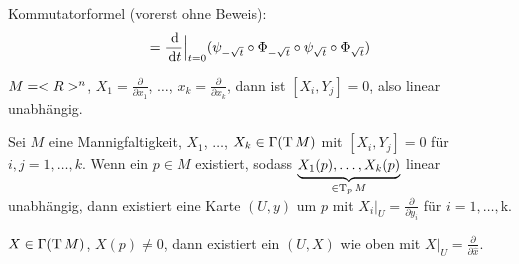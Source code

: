 Kommutatorformel (vorerst ohne Beweis):\begin{align*}
	[X,Y] = \frac{\d}{\d t}\Big|_{t=0} (\psi_{-\sqrt t}\circ \Phi_{-\sqrt t}\circ \psi_{\sqrt t}\circ \Phi_{\sqrt t})
\end{align*}

\begin{example}
	$M=<R>^n$, $X_1 = \frac\partial{\partial x_1}$, $\dots$, $x_k = \frac{\partial}{\partial x_k}$, dann ist $[X_i,Y_j] = 0$, also linear unabhängig.
\end{example}

\begin{proposition}
	Sei $M$ eine Mannigfaltigkeit, $X_1$, $\dots$, $X_k\in\Gamma(\operatorname{T} M)$ mit $[X_i, Y_j] = 0$ für $i,j=1,\dots,k$. Wenn ein $p\in M$ existiert, sodass $\underbrace{X_1(p),\dots, X_k(p)}_{\in\operatorname{T}_p M}$ linear unabhängig, dann existiert eine Karte $(U,y)$ um $p$ mit $X_i\big|_U = \frac{\partial}{\partial y_i}$ für $i=1,\dots,$k.
\end{proposition}

\begin{conclusion}
	$X\in\Gamma(\operatorname{T} M)$, $X(p)\neq 0$, dann existiert ein $(U,X)$ wie oben mit $X\big|_U = \frac{\partial}{\partial\hat x}$.
\end{conclusion}

